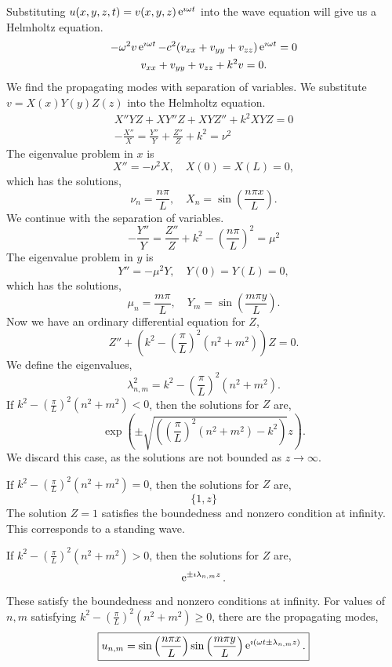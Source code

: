 {%
\begin{Solution}
  \label{solution propagating modes square waveguide}
  Substituting $u(x, y, z, t) = v(x, y, z) \mathop{\mathrm{e}}\nolimits^{\imath \omega t}$ into the wave 
  equation will give us a Helmholtz equation.
  \begin{gather*}
    - \omega^2 v \mathop{\mathrm{e}}\nolimits^{\imath \omega t} - c^2 (v_{x x} + v_{y y} + v_{z z}) 
    \mathop{\mathrm{e}}\nolimits^{\imath \omega t} = 0 \\
    v_{x x} + v_{y y} + v_{z z} + k^2 v = 0.
  \end{gather*}
  We find the propagating modes with separation of variables.  We substitute
  $v = X(x) Y(y) Z(z)$ into the Helmholtz equation.
  \begin{gather*}
    X'' Y Z + X Y'' Z + X Y Z'' + k^2 X Y Z = 0 \\
    - \frac{X''}{X} = \frac{Y''}{Y} + \frac{Z''}{Z} + k^2 = \nu^2
  \end{gather*}
  The eigenvalue problem in $x$ is
  \[
  X'' = - \nu^2 X, \quad X(0) = X(L) = 0,
  \]
  which has the solutions,
  \[
  \nu_n = \frac{n \pi}{L}, \quad X_n = \sin \left( \frac{n \pi x}{L} \right).
  \]
  We continue with the separation of variables.
  \[
  - \frac{Y''}{Y} = \frac{Z''}{Z} + k^2 - \left( \frac{n \pi}{L} \right)^2
  = \mu^2
  \]
  The eigenvalue problem in $y$ is
  \[
  Y'' = - \mu^2 Y, \quad Y(0) = Y(L) = 0,
  \]
  which has the solutions,
  \[
  \mu_n = \frac{m \pi}{L}, \quad Y_m = \sin \left( \frac{m \pi y}{L} \right).
  \]
  Now we have an ordinary differential equation for $Z$,
  \[
  Z'' + \left( k^2 - \left( \frac{\pi}{L} \right)^2 \left( n^2 + m^2 \right) 
  \right) Z = 0.
  \]
  We define the eigenvalues,
  \[
  \boxed{
    \lambda_{n,m}^2 = k^2 - \left( \frac{\pi}{L} \right)^2 \left( n^2 + m^2\right).
    }
  \]
  If $k^2 - \left( \frac{\pi}{L} \right)^2 \left( n^2 + m^2\right) < 0$, then the
  solutions for $Z$ are,
  \[
  \exp \left( \pm \sqrt{ \left( \left( \frac{\pi}{L} \right)^2 
        \left(n^2 + m^2 \right) - k^2 \right) } z \right).
  \]
  We discard this case, as the solutions are not bounded as $z \to \infty$.

  If $k^2 - \left( \frac{\pi}{L} \right)^2 \left( n^2 + m^2\right) = 0$, then the
  solutions for $Z$ are,
  \[
  \{ 1, z \}
  \]
  The solution $Z = 1$ satisfies the boundedness and nonzero condition at 
  infinity.  This corresponds to a standing wave.

  If $k^2 - \left( \frac{\pi}{L} \right)^2 \left( n^2 + m^2\right) > 0$, then the
  solutions for $Z$ are,
  \[
  \mathop{\mathrm{e}}\nolimits^{\pm \imath \lambda_{n,m} z}.
  \]
  These satisfy the boundedness and nonzero conditions at infinity.
  For values of $n, m$ satisfying
  $k^2 - \left( \frac{\pi}{L} \right)^2 \left( n^2 + m^2\right) \geq 0$, there
  are the propagating modes,
  \[
  \boxed{
    u_{n,m} = \sin \left( \frac{n \pi x}{L} \right)
    \sin \left( \frac{m \pi y}{L} \right)
    \mathop{\mathrm{e}}\nolimits^{\imath (\omega t \pm \lambda_{n,m} z)}.
    }
  \]
\end{Solution}


}
